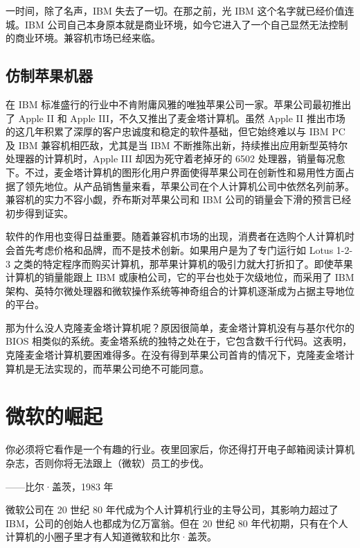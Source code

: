 \documentclass[12pt,UTF8]{ctexbook}
\begin{document}
一时间，除了名声，IBM 失去了一切。在那之前，光 IBM 这个名字就已经价值连城。IBM 公司自己本身原本就是商业环境，如今它进入了一个自己显然无法控制的商业环境。兼容机市场已经来临。





\subsection{仿制苹果机器}


在 IBM 标准盛行的行业中不肯附庸风雅的唯独苹果公司一家。苹果公司最初推出了 Apple II 和 Apple III，不久又推出了麦金塔计算机。虽然 Apple II 推出市场的这几年积累了深厚的客户忠诚度和稳定的软件基础，但它始终难以与 IBM PC 及 IBM 兼容机相匹敌，尤其是当 IBM 不断推陈出新，持续推出应用新型英特尔处理器的计算机时，Apple III 却因为死守着老掉牙的 6502 处理器，销量每况愈下。不过，麦金塔计算机的图形化用户界面使得苹果公司在创新性和易用性方面占据了领先地位。从产品销售量来看，苹果公司在个人计算机公司中依然名列前茅。兼容机的实力不容小觑，乔布斯对苹果公司和 IBM 公司的销量会下滑的预言已经初步得到证实。

软件的作用也变得日益重要。随着兼容机市场的出现，消费者在选购个人计算机时会首先考虑价格和品牌，而不是技术创新。如果用户是为了专门运行如 Lotus 1-2-3 之类的特定程序而购买计算机，那苹果计算机的吸引力就大打折扣了。即使苹果计算机的销量能跟上 IBM 或康柏公司，它的平台也处于次级地位，而采用了 IBM 架构、英特尔微处理器和微软操作系统等神奇组合的计算机逐渐成为占据主导地位的平台。

那为什么没人克隆麦金塔计算机呢？原因很简单，麦金塔计算机没有与基尔代尔的 BIOS 相类似的系统。麦金塔系统的独特之处在于，它包含数千行代码。这表明，克隆麦金塔计算机要困难得多。在没有得到苹果公司首肯的情况下，克隆麦金塔计算机是无法实现的，而苹果公司绝不可能同意。





\section{微软的崛起}


你必须将它看作是一个有趣的行业。夜里回家后，你还得打开电子邮箱阅读计算机杂志，否则你将无法跟上（微软）员工的步伐。

——比尔·盖茨，1983 年



微软公司在 20 世纪 80 年代成为个人计算机行业的主导公司，其影响力超过了 IBM，公司的创始人也都成为亿万富翁。但在 20 世纪 80 年代初期，只有在个人计算机的小圈子里才有人知道微软和比尔·盖茨。
\end{document}
